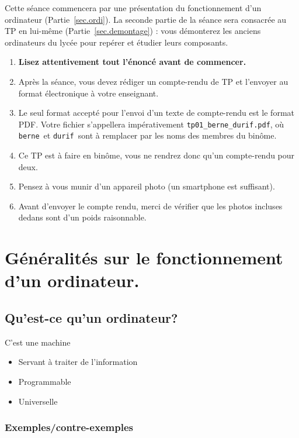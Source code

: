 \begin{multicols}{2}
Cette séance commencera par une présentation du fonctionnement d'un ordinateur (Partie~\ref{sec.ordi}). 
La seconde partie de la séance sera consacrée au TP en lui-même (Partie~\ref{sec.demontage}) : vous 
démonterez les anciens ordinateurs du lycée pour repérer et étudier leurs composants. 

\begin{enumerate}
\item  \textbf{Lisez attentivement  tout l'énoncé
    avant de commencer.}
\item Après la séance, vous devez rédiger un compte-rendu de TP et
l'envoyer au format électronique à votre enseignant.
\item Le seul format accepté pour l'envoi d'un texte de compte-rendu est le
format PDF. Votre fichier s'appellera impérativement \texttt{tp01\_berne\_durif.pdf}, où \og \texttt{berne}\fg\ et \og \texttt{durif}\fg\ sont à remplacer par les noms des membres du binôme. 
\item Ce TP est à faire en binôme, vous ne rendrez donc qu'un
  compte-rendu pour deux.
\item Pensez à vous munir d'un appareil photo (un smartphone est suffisant).
\item Avant d'envoyer le compte rendu, merci de vérifier que les photos incluses dedans sont d'un poids raisonnable.
\end{enumerate}


\section*{Généralités sur le fonctionnement d'un ordinateur.}\label{sec.ordi}

\subsection*{Qu'est-ce qu'un ordinateur?}

C'est une machine
\begin{itemize}
\item Servant à traiter de l'information
\item Programmable
\item Universelle
\end{itemize}

\subsubsection*{Exemples/contre-exemples}


\end{multicols}
